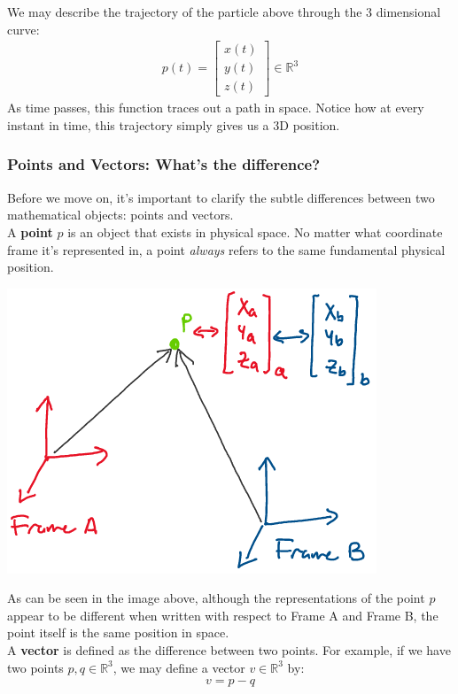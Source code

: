 \documentclass[oneside]{book}
\begin{document}
We may describe the trajectory of the particle above through the 3 dimensional curve:
\begin{align}
    p(t) = 
    \begin{bmatrix}
    x(t)\\
    y(t)\\
    z(t)
    \end{bmatrix}
    \in \mathbb{R}^3
\end{align}
As time passes, this function traces out a path in space. Notice how at every instant in time, this trajectory simply gives us a 3D position.
\subsubsection{Points and Vectors: What's the difference?}
Before we move on, it's important to clarify the subtle differences between two mathematical objects: points and vectors.\\
A \textbf{point} $p$ is an object that exists in physical space. No matter what coordinate frame it's represented in, a point \textit{always} refers to the same fundamental physical position.
\begin{center}
    \includegraphics[scale=0.5]{images/point.png}\\
\end{center}
As can be seen in the image above, although the representations of the point $p$ appear to be different when written with respect to Frame A and Frame B, the point itself is the same position in space.\\
A \textbf{vector} is defined as the difference between two points. For example, if we have two points $p, q \in \mathbb{R}^3$, we may define a vector $v\in \mathbb{R}^3$ by:
\begin{align}
    v = p - q
\end{align}
\end{document}
